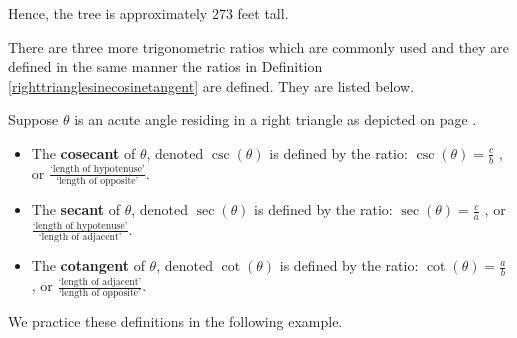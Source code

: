 \documentclass{ximera}
\begin{document}
\begin{example}
\begin{explanation}
\begin{enumerate}
Hence, the tree is approximately $273$ feet tall.  

\end{enumerate}
\end{explanation}
\end{example} 

There are three more trigonometric ratios which are commonly used and they are defined in the same manner the ratios in Definition \ref{righttrianglesinecosinetangent} are defined.  They are listed below.





\begin{definition} \label{righttriangletherest}



Suppose $\theta$ is an acute angle residing in a right triangle as depicted on page \pageref{righttranglediagram}.

\begin{itemize}


\item  The  \textbf{cosecant} of $\theta$, denoted $\csc(\theta)$ is defined by the ratio: $\csc(\theta) = \frac{c}{b}$ , or $\frac{\text{`length of hypotenuse'}}{\text{`length of opposite'}}$.

\item  The  \textbf{secant} of $\theta$, denoted $\sec(\theta)$ is defined by the ratio: $\sec(\theta) = \frac{c}{a} $ , or $\frac{\text{`length of hypotenuse'}}{\text{`length of adjacent'}}$.

\item  The  \textbf{cotangent} of $\theta$, denoted $\cot(\theta)$ is defined by the ratio: $\cot(\theta) = \frac{a}{b} $ , or $\frac{\text{`length of adjacent'}}{\text{`length of opposite'}}$.

\end{itemize}



\end{definition}





We practice these definitions in the following example.
\end{document}
